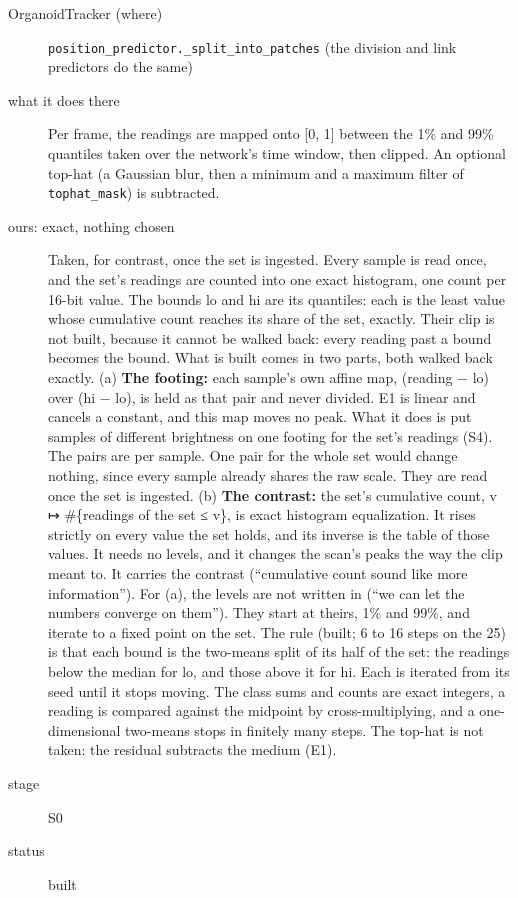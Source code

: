 \begin{description}
\item[{OrganoidTracker (where)}] \texttt{position\_\allowbreak{}predictor.\allowbreak{}\_\allowbreak{}split\_\allowbreak{}into\_\allowbreak{}patches} (the division and link predictors do the same)
\item[{what it does there}] Per frame, the readings are mapped onto [0, 1] between the 1\% and 99\% quantiles taken over the network's time window, then clipped. An optional top-hat (a Gaussian blur, then a minimum and a maximum filter of \texttt{tophat\_\allowbreak{}mask}) is subtracted.
\item[{ours: exact, nothing chosen}] Taken, for contrast, once the set is ingested. Every sample is read once, and the set's readings are counted into one exact histogram, one count per 16-bit value. The bounds lo and hi are its quantiles: each is the least value whose cumulative count reaches its share of the set, exactly. Their clip is not built, because it cannot be walked back: every reading past a bound becomes the bound. What is built comes in two parts, both walked back exactly. (a) \textbf{The footing:} each sample's own affine map, (reading − lo) over (hi − lo), is held as that pair and never divided. E1 is linear and cancels a constant, and this map moves no peak. What it does is put samples of different brightness on one footing for the set's readings (S4). The pairs are per sample. One pair for the whole set would change nothing, since every sample already shares the raw scale. They are read once the set is ingested. (b) \textbf{The contrast:} the set's cumulative count, v ↦ \#\{readings of the set ≤ v\}, is exact histogram equalization. It rises strictly on every value the set holds, and its inverse is the table of those values. It needs no levels, and it changes the scan's peaks the way the clip meant to. It carries the contrast (“cumulative count sound like more information”). For (a), the levels are not written in (“we can let the numbers converge on them”). They start at theirs, 1\% and 99\%, and iterate to a fixed point on the set. The rule (built; 6 to 16 steps on the 25) is that each bound is the two-means split of its half of the set: the readings below the median for lo, and those above it for hi. Each is iterated from its seed until it stops moving. The class sums and counts are exact integers, a reading is compared against the midpoint by cross-multiplying, and a one-dimensional two-means stops in finitely many steps. The top-hat is not taken: the residual subtracts the medium (E1).
\item[{stage}] S0
\item[{status}] built
\end{description}

